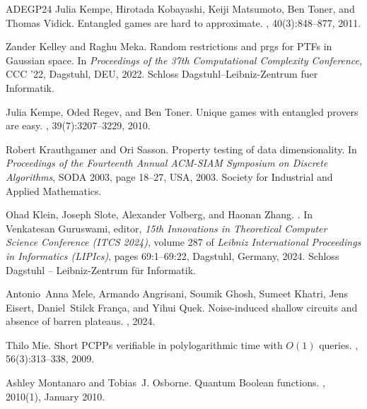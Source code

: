 \documentclass[10pt,a4paper]{article}
\theoremstyle{plain}
\theoremstyle{definition}
\newcommand{\1}{\mathbb{1}} %
\begin{document}
\begin{thebibliography}{ADEGP24}
Julia Kempe, Hirotada Kobayashi, Keiji Matsumoto, Ben Toner, and Thomas Vidick.
\newblock Entangled games are hard to approximate.
, 40(3):848--877, 2011.

Zander Kelley and Raghu Meka.
\newblock Random restrictions and prgs for {PTF}s in {G}aussian space.
\newblock In {\em Proceedings of the 37th Computational Complexity Conference},
  CCC '22, Dagstuhl, DEU, 2022. Schloss Dagstuhl--Leibniz-Zentrum fuer
  Informatik.

Julia Kempe, Oded Regev, and Ben Toner.
\newblock Unique games with entangled provers are easy.
, 39(7):3207--3229, 2010.

Robert Krauthgamer and Ori Sasson.
\newblock Property testing of data dimensionality.
\newblock In {\em Proceedings of the Fourteenth Annual ACM-SIAM Symposium on
  Discrete Algorithms}, SODA 2003, page 18–27, USA, 2003. Society for
  Industrial and Applied Mathematics.

Ohad Klein, Joseph Slote, Alexander Volberg, and Haonan Zhang.
.
\newblock In Venkatesan Guruswami, editor, {\em 15th Innovations in Theoretical
  Computer Science Conference (ITCS 2024)}, volume 287 of {\em Leibniz
  International Proceedings in Informatics (LIPIcs)}, pages 69:1--69:22,
  Dagstuhl, Germany, 2024. Schloss Dagstuhl -- Leibniz-Zentrum f{\"u}r
  Informatik.

Antonio~Anna Mele, Armando Angrisani, Soumik Ghosh, Sumeet Khatri, Jens Eisert,
  Daniel~Stilck Fran{\c{c}}a, and Yihui Quek.
\newblock Noise-induced shallow circuits and absence of barren plateaus.
, 2024.

Thilo Mie.
\newblock Short {PCPPs} verifiable in polylogarithmic time with {$O(1)$}
  queries.
,
  56(3):313--338, 2009.

Ashley Montanaro and Tobias~J. Osborne.
\newblock Quantum {B}oolean functions.
, 2010(1),
  January 2010.


\end{thebibliography}
\end{document}
